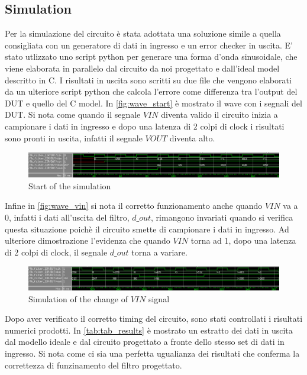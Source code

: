 \subsection{Simulation}
Per la simulazione del circuito è stata adottata una soluzione simile a quella consigliata con un generatore di dati in ingresso e un error checker in uscita. E' stato utlizzato uno script python per generare una forma d'onda sinusoidale, che viene elaborata in parallelo dal circuito da noi progettato e dall'ideal model descritto in C. I risultati in uscita sono scritti su due file che vengono elaborati da un ulteriore script python che calcola l'errore come differenza tra l'output del DUT e quello del C model.
In \autoref{fig:wave_start} è mostrato il wave con i segnali del DUT. Si nota come quando il segnale $VIN$ diventa valido il circuito inizia a campionare i dati in ingresso e dopo una latenza di 2 colpi di clock i risultati sono pronti in uscita, infatti il segnale $VOUT$ diventa alto.

\begin{figure}[h]
	\center
	\includegraphics[width=1\textwidth]{images/wave_start.png}
	\caption{Start of the simulation}
	\label{fig:wave_start}
\end{figure}

Infine in \autoref{fig:wave_vin} si nota il corretto funzionamento anche quando $VIN$ va a 0, infatti i dati all'uscita del filtro, $d\_out$, rimangono invariati quando si verifica questa situazione poichè il circuito smette di campionare i dati in ingresso. Ad ulteriore dimostrazione l'evidenza che quando $VIN$ torna ad 1, dopo una latenza di 2 colpi di clock, il segnale $d\_out$ torna a variare.

\begin{figure}[h]
	\center
	\includegraphics[width=1\textwidth]{images/wave_vin_0_1.png}
	\caption{Simulation of the change of $VIN$ signal}
	\label{fig:wave_vin}
\end{figure}

Dopo aver verificato il corretto timing del circuito, sono stati controllati i risultati numerici prodotti. In \autoref{tab:tab_results} è mostrato un estratto dei dati in uscita dal modello ideale e dal circuito progettato a fronte dello stesso set di dati in ingresso. Si nota come ci sia una perfetta ugualianza dei risultati che conferma la correttezza di funzinamento del filtro progettato.

